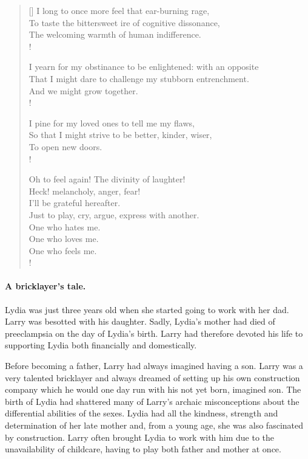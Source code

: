 \begin{verse}[\versewidth]
I long to once more feel that ear-burning rage,\\
To taste the bittersweet ire of cognitive dissonance,\\
The welcoming warmth of human indifference.\\!

I yearn for my obstinance to be enlightened: with an opposite\\
That I might dare to challenge my stubborn entrenchment.\\
And we might grow together.\\!

I pine for my loved ones to tell me my flaws,\\
So that I might strive to be better, kinder, wiser,\\ 
To open new doors.\\!

Oh to feel again! The divinity of laughter!\\
Heck! melancholy, anger, fear!\\
I'll be grateful hereafter.\\
Just to play, cry, argue, express with another.\\
One who hates me.\\
One who loves me.\\
One who feels me.\\!

\end{verse}

\fugue

\paragraph{A bricklayer's tale.}\strut

Lydia was just three years old when she started going to work with her
dad. Larry was besotted with his daughter. Sadly, Lydia's mother had
died of preeclampsia on the day of Lydia's birth. Larry had therefore
devoted his life to supporting Lydia both financially and
domestically.

Before becoming a father, Larry had always imagined having a
son. Larry was a very talented bricklayer and always dreamed of
setting up his own construction company which he would one day run
with his not yet born, imagined son. The birth of Lydia had shattered
many of Larry's archaic misconceptions about the differential
abilities of the sexes. Lydia had all the kindness, strength
and determination of her late mother and, from a young age, she was also %
fascinated by construction. Larry often brought Lydia to work with him
due to the unavailability of childcare, having to play both father and
mother at once.

